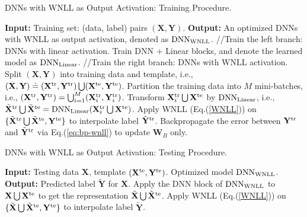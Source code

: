 \documentclass{article}
\begin{document}
\begin{algorithm}
\caption{DNNs with WNLL as Output Activation: Training Procedure.}\label{alg-Train}
\begin{algorithmic}
\State \textbf{Input: } Training set: (data, label) pairs $(\mathbf{X}, \mathbf{Y})$.
\State \textbf{Output: } An optimized DNNs with WNLL as output activation, denoted as ${\rm DNN}_{\rm WNLL}$.
\State //Train the left branch: DNNs with linear activation.
\State Train DNN $+$ Linear blocks, and denote the learned model as ${\rm DNN}_{\rm Linear}$.
\State //Train the right branch: DNNs with WNLL activation.
\State Split $(\mathbf{X}, \mathbf{Y})$ into training data and template, i.e., $(\mathbf{X}, \mathbf{Y}) \doteq (\mathbf{X}^{\rm tr}, \mathbf{Y}^{\rm tr}) \bigcup (\mathbf{X}^{\rm te}, \mathbf{Y}^{\rm te})$.
\State Partition the training data into $M$ mini-batches, i.e., $(\mathbf{X}^{\rm tr}, \mathbf{Y}^{\rm tr}) = \bigcup_{i=1}^M (\mathbf{X}_i^{\rm tr}, \mathbf{Y}_i^{\rm tr})$.
\State Transform $\mathbf{X}_i^{\rm tr}\bigcup \mathbf{X}^{\rm te}$ by ${\rm DNN}_{\rm Linear}$, i.e.,  $\tilde{\mathbf{X}}^{\rm tr} \bigcup \tilde{\mathbf{X}}^{\rm te} = {\rm DNN}_{\rm Linear}(\mathbf{X}_i^{\rm tr}\bigcup \mathbf{X}^{\rm te})$.
\State Apply WNLL (Eq.(\ref{WNLL})) on $\{\tilde{\mathbf{X}}^{\rm tr} \bigcup \tilde{\mathbf{X}}^{\rm te}, \mathbf{Y}^{\rm te}\}$ to interpolate label $\tilde{\mathbf{Y}}^{\rm tr}$.
\State Backpropagate the error between $\mathbf{Y}^{\rm tr}$ and $\tilde{\mathbf{Y}}^{\rm tr}$ via Eq.(\ref{eq:bp-wnll}) to update $\mathbf{W}_B$ only.
\EndFor
\EndFor
\end{algorithmic}
\end{algorithm}



\begin{algorithm}
\caption{DNNs with WNLL as Output Activation: Testing Procedure.}\label{alg-Test}
\begin{algorithmic}
\State \textbf{Input: } Testing data $\mathbf{X}$, template $(\mathbf{X}^{\rm te}, \mathbf{Y}^{\rm te})$. Optimized model ${\rm DNN}_{\rm WNLL}$.
\State \textbf{Output: } Predicted label $\tilde{\mathbf{Y}}$ for $\mathbf{X}$.
\State Apply the DNN block of ${\rm DNN}_{\rm WNLL}$ to $\mathbf{X}\bigcup \mathbf{X}^{\rm te}$ to get the representation $\tilde{\mathbf{X}}\bigcup \tilde{\mathbf{X}}^{\rm te}$.
\State Apply WNLL (Eq.(\ref{WNLL})) on $\{\tilde{\mathbf{X}} \bigcup \tilde{\mathbf{X}}^{\rm te}, \mathbf{Y}^{\rm te}\}$ to interpolate label $\tilde{\mathbf{Y}}$.
\end{algorithmic}
\end{algorithm}
\end{document}
